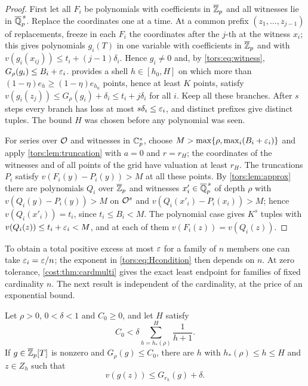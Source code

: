 \begin{proof}
First let all $F_i$ be polynomials with coefficients in $\overline{\mathbb{Z}}_p$ and all
witnesses lie in $\overline{\mathbb{Q}}_p^{\,s}$. Replace the coordinates one at a time. At a
common prefix $(z_1,\dots,z_{j-1})$ of replacements, freeze in each $F_i$ the coordinates
after the $j$-th at the witness $x_i$; this gives polynomials $g_i(T)$ in one variable
with coefficients in $\overline{\mathbb{Z}}_p$ and with $v(g_i(x_{ij}))\le t_i+(j-1)\delta_i$. Hence $g_i\ne0$ and, by
\eqref{tors:eq:witness}, $G_\rho(g_i)\le B_i+\varepsilon_i$.  provides
a shell $h\in[h_0,H]$ on which more than $(1-\eta)e_h\ge(1-\eta)e_{h_0}$ points, hence at
least $K$ points, satisfy $v(g_i(z_j))\le G_\rho(g_i)+\delta_i\le t_i+j\delta_i$ for all
$i$. Keep all these branches. After $s$ steps every branch has loss at most
$s\delta_i\le\varepsilon_i$, and distinct prefixes give distinct tuples. The bound $H$ was
chosen before any polynomial was seen.

For series over $\mathcal{O}$ and witnesses in $\mathbb{C}_p^s$, choose $M>\max\{\rho,\max_i(B_i+\varepsilon_i)\}$
and apply \cref{tors:lem:truncation} with $a=0$ and $r=r_H$; the coordinates of the
witnesses and of all points of the grid have valuation at least $r_H$. The truncations
$P_i$ satisfy $v(F_i(y)-P_i(y))>M$ at all these points. By \cref{tors:lem:approx} there
are polynomials $Q_i$ over $\overline{\mathbb{Z}}_p$ and witnesses $x'_i\in\overline{\mathbb{Q}}_p^{\,s}$
of depth $\rho$ with $v(Q_i(y)-P_i(y))>M$ on $\mathcal{O}^s$ and $v(Q_i(x'_i)-P_i(x_i))>M$; hence
$v(Q_i(x'_i))=t_i$, since $t_i\le B_i<M$. The polynomial case gives $K^s$ tuples with
$v(Q_i(z))\le t_i+\varepsilon_i<M$, and at each of them $v(F_i(z))=v(Q_i(z))$.
\end{proof}

To obtain a total positive excess at most $\varepsilon$ for a family of $n$ members one can take
$\varepsilon_i=\varepsilon/n$; the exponent in \eqref{tors:eq:Hcondition} then depends on $n$. At zero
tolerance, \cref{cost:thm:cardmulti} gives the exact least endpoint for families of fixed
cardinality $n$. The next result is independent of the cardinality, at the price of an
exponential bound.

\begin{lemma}\label{tors:lem:harmonic}
Let $\rho>0$, $0<\delta<1$ and $C_0\ge0$, and let $H$ satisfy
\[
  C_0<\delta\sum_{h=h_*(\rho)}^{H}\frac1{h+1}.
\]
If $g\in\overline{\mathbb{Z}}_p[T]$ is nonzero and $G_\rho(g)\le C_0$, there are $h$ with
$h_*(\rho)\le h\le H$ and $z\in Z_h$ such that
\[
  v(g(z))\le G_{r_h}(g)+\delta .
\]
\end{lemma}

